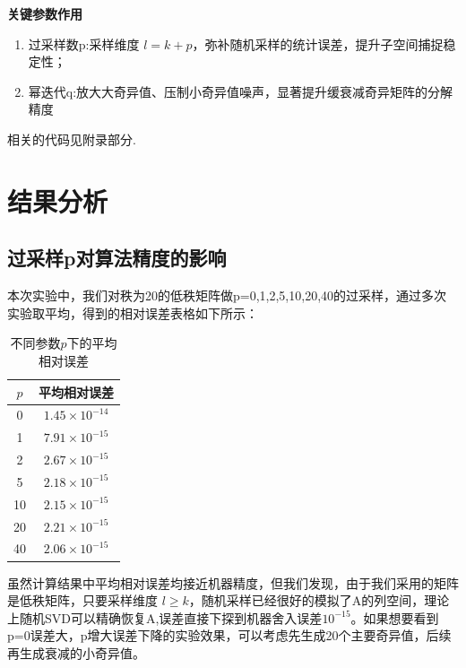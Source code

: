 \documentclass{article}
\begin{document}
\noindent
\textbf{关键参数作用}


\begin{enumerate}
	\item 
	过采样数p:采样维度 \(l=k+p\)，弥补随机采样的统计误差，提升子空间捕捉稳定性；
	\item 
	幂迭代q:放大大奇异值、压制小奇异值噪声，显著提升缓衰减奇异矩阵的分解精度
\end{enumerate}





相关的代码见附录部分.







\section{结果分析}%

\subsection{过采样p对算法精度的影响}

\noindent


本次实验中，我们对秩为20的低秩矩阵做p=0,1,2,5,10,20,40的过采样，通过多次实验取平均，得到的相对误差表格如下所示：

\begin{table}[htbp]
	\centering
	\caption{不同参数$p$下的平均相对误差}
	\begin{tabular}{cc}
		\hline
		$p$ & 平均相对误差 \\
		\hline
		0  & $1.45\times 10^{-14}$ \\
		1  & $7.91\times 10^{-15}$ \\
		2  & $2.67\times 10^{-15}$ \\
		5  & $2.18\times 10^{-15}$ \\
		10 & $2.15\times 10^{-15}$ \\
		20 & $2.21\times 10^{-15}$ \\
		40 & $2.06\times 10^{-15}$ \\
		\hline
	\end{tabular}
\end{table}

虽然计算结果中平均相对误差均接近机器精度，但我们发现，由于我们采用的矩阵是低秩矩阵，只要采样维度 \(l\ge k\)，随机采样已经很好的模拟了A的列空间，理论上随机SVD可以精确恢复A,误差直接下探到机器舍入误差\(10^{-15}\)。如果想要看到p=0误差大，p增大误差下降的实验效果，可以考虑先生成20个主要奇异值，后续再生成衰减的小奇异值。
\end{document}
